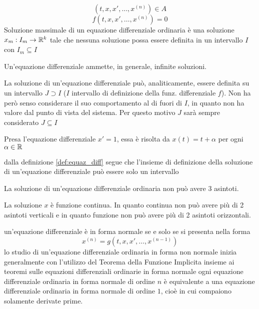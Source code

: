 $$(t,x, x',\ldots,x^{(n)}) \in A$$
$$f(t,x, x',\ldots,x^{(n)})=0$$
Soluzione massimale  di un equazione differenziale ordinaria è una soluzione $x_m:I_m\to \mathbb{R}^k$ tale che nessuna soluzione possa essere definita in un intervallo $I$ con $I_m\subseteq I$
\begin{note}
	Un'equazione differenziale ammette, in generale, infinite soluzioni.
\end{note}
\begin{note}
	\label{note:diff_eq_sol_definition_set}
	La soluzione di un'equazione differenziale può, analiticamente, essere definita su un intervallo $J\supset I$ ($I$ intervallo di definizione della funz. differenziale $f$). Non ha però senso considerare il suo comportamento al di fuori di $I$, in quanto non ha valore dal punto di vista del sistema. Per questo motivo $J$ sarà sempre considerato $J\subseteq I$
\end{note}
\begin{example}
	Presa l'equazione differenziale $ x'=1$, essa è risolta da $x(t) = t + \alpha$ per ogni $\alpha\in\mathbb{R}$
\end{example}
\begin{note}
	dalla definizione \ref{def:equaz_diff} segue che l'insieme di definizione della soluzione di un'equazione differenziale può essere solo un intervallo
\end{note}
\exercise
La soluzione di un'equazione differenziale ordinaria non può avere 3 asintoti.
\begin{exercise_answer}
	La soluzione $x$ è funzione continua. In quanto continua non può avere più di 2 asintoti verticali e in quanto funzione non può avere più di 2 asintoti orizzontali.
\end{exercise_answer}
un'equazione differenziale è in forma normale  se e solo se si presenta nella forma 
$$x^{(n)} = g(t,x, x',\ldots,x^{(n-1)})$$
\observation
lo studio di un'equazione differenziale ordinaria in forma non normale inizia generalmente con l'utilizzo del Teorema della Funzione Implicita insieme ai teoremi sulle equazioni differenziali ordinarie in forma normale
\proposition\label{prop:equaz_n_equival_1}
ogni equazione differenziale ordinaria in forma normale di ordine $n$ è equivalente a una equazione differenziale ordinaria in forma normale di ordine $1$, cioè in cui compaiono solamente derivate prime.
